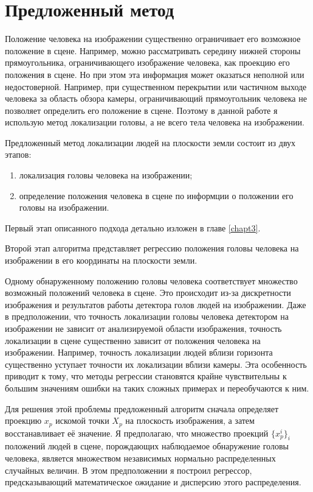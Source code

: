 \section{Предложенный метод}

Положение человека на изображении существенно ограничивает его возможное положение в сцене. Например, можно рассматривать середину нижней стороны прямоугольника, ограничивающего изображение человека, как проекцию его положения в сцене. Но при этом эта информация может оказаться неполной или недостоверной. Например, при существенном перекрытии или частичном выходе человека за область обзора камеры, ограничивающий прямоугольник человека не позволяет определить его положение в сцене. Поэтому в данной работе я использую метод локализации головы, а не всего тела человека на изображении.

Предложенный метод локализации людей на плоскости земли состоит из двух этапов:
\begin{enumerate}
	\item локализация головы человека на изображении;
	\item определение положения человека в сцене по информции о положении его головы на изображении.
\end{enumerate}
Первый этап описанного подхода детально изложен в главе \ref{chapt3}.

Второй этап алгоритма представляет регрессию положения головы человека на изображении в его координаты на плоскости земли.

Одному обнаруженному положению головы человека соответствует множество возможный положений человека в сцене. Это происходит из-за дискретности изображения и результатов работы детектора голов людей на изображении. Даже в предположении, что точность локализации головы человека детектором на изображении не зависит от анализируемой области изображения, точность локализации в сцене существенно зависит от положения человека на изображении.  Например, точность локализации людей вблизи горизонта существенно уступает точности их локализации вблизи камеры. Эта особенность приводит к тому, что методы регрессии становятся крайне чувствительны к большим значениям ошибки на таких сложных примерах и переобучаются к ним.

Для решения этой проблемы предложенный алгоритм сначала определяет проекцию $x_p$ искомой точки $X_p$ на плоскость изображения, а затем восстанавливает её значение. Я предполагаю, что множество проекций $\{x_p^i\}_i$ положений людей в сцене, порождающих наблюдаемое обнаружение головы человека, является множеством независимых нормально распределенных случайных величин. В этом предположении я построил регрессор, предсказывающий математическое ожидание и дисперсию этого распределения.


